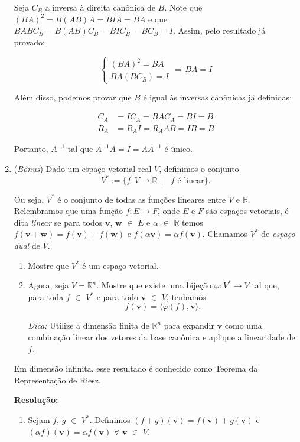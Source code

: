 \documentclass[leqno]{article}
\begin{document}
\begin{enumerate}
    Seja $C_B$ a inversa à direita canônica de $B$. Note que $(BA)^2=B(AB)A=BIA=BA$ e que $BABC_B=B(AB)C_B=BIC_B=BC_B=I$. Assim, pelo resultado já provado:
    
    $$\begin{cases}(BA)^2=BA\\BA(BC_B)=I\end{cases}\Rightarrow BA=I$$
    
    Além disso, podemos provar que $B$ é igual às inversas canônicas já definidas:
    
    \begin{align*}
        C_A&=IC_A=BAC_A=BI=B\\
        R_A&=R_AI=R_AAB=IB=B
    \end{align*}
    
    Portanto, $A^{-1}$ tal que $A^{-1}A=I=AA^{-1}$ é único.
    
    \item (\textit{Bônus}) Dado um espaço vetorial real $V$, definimos o conjunto
    $$V^*:=\{f:V\rightarrow\mathbb{R}\text{ }|\text{ }f\text{ é linear}\}\text{.}$$
    
    Ou seja, $V^*$ é o conjunto de todas as funções lineares entre $V$ e $\mathbb{R}$. Relembramos que uma função $f:E\rightarrow F$, onde $E$ e $F$ são espaços vetoriais, é dita \textit{linear} se para todos $\textbf{v}$, $\textbf{w}$ $\in$ $E$ e $\alpha$ $\in$ $\mathbb{R}$ temos $f(\textbf{v}+\textbf{w})=f(\textbf{v})+f(\textbf{w})$ e $f(\alpha\textbf{v})=\alpha f(\textbf{v})$. Chamamos $V^*$ de \textit{espaço dual} de $V$.
    
    \begin{enumerate}
        \item Mostre que $V^*$ é um espaço vetorial.
        \item Agora, seja $V=\mathbb{R}^n$. Mostre que existe uma bijeção $\varphi:V^*\rightarrow V$ tal que, para toda $f$ $\in$ $V^*$ e para todo $\textbf{v}$ $\in$ $V$, tenhamos
        $$f(\textbf{v})=\langle\varphi(f),\textbf{v}\rangle\text{.}$$
        
        \textit{Dica:} Utilize a dimensão finita de $\mathbb{R}^n$ para expandir $\textbf{v}$ como uma combinação linear dos vetores da base canônica e aplique a linearidade de $f$.
    \end{enumerate}
    
    Em dimensão infinita, esse resultado é conhecido como Teorema da Representação de Riesz.
    
    \textbf{Resolução:}
    \begin{enumerate}
        \item Sejam $f$, $g$ $\in$ $V^*$. Definimos $(f+g)(\textbf{v})=f(\textbf{v})+g(\textbf{v})$ e $(\alpha f)(\textbf{v})=\alpha f(\textbf{v})$ $\forall$ $\textbf{v}$ $\in$ $V$.
        

\end{enumerate}
\end{enumerate}
\end{document}

